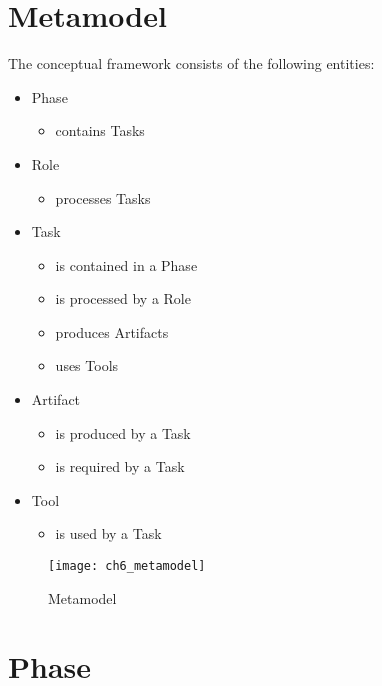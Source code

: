 \section{Metamodel}
\label{sec:ch6_metamodel}
The conceptual framework consists of the following entities:
\begin{itemize}
	\item Phase
	\begin{itemize}
		\item contains Tasks
	\end{itemize}
	\item Role
	\begin{itemize}
		\item processes Tasks
	\end{itemize}
	\item Task
	\begin{itemize}
		\item is contained in a Phase
		\item is processed by a Role
		\item produces Artifacts
		\item uses Tools
	\end{itemize}
	\item Artifact
	\begin{itemize}
		\item is produced by a Task
		\item is required by a Task
	\end{itemize}
	\item Tool
	\begin{itemize}
		\item is used by a Task
	\end{itemize}
\end{itemize}

\begin{figure}
	[htpb] \centering 
	\texttt{[image: ch6\_metamodel]} 
	\caption{Metamodel} 
	\label{fig:ch6_metamodel} 
\end{figure}

\section{Phase}

